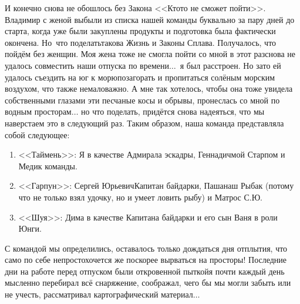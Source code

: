 И конечно снова не обошлось без Закона <<Кто\sdash то не сможет пойти>>. Владимир с женой выбыли из списка нашей команды буквально за пару дней до старта, когда уже были закуплены продукты и подготовка была фактически окончена. Но~что поделать\mdash такова Жизнь и Законы Сплава. Получалось, что пойдём без женщин. Моя жена тоже не смогла пойти со мной в этот раз\mdash снова не удалось совместить наши отпуска по времени$\ldots$~я был расстроен. Но зато ей удалось съездить на юг к морю\mdash позагорать и пропитаться солёным морским воздухом, что также немаловажно. А мне так хотелось, чтобы она тоже увидела собственными глазами эти песчаные косы и обрывы, пронеслась со мной по водным просторам$\ldots$ но что поделать, придётся снова надеяться, что мы наверстаем это в следующий раз. 
Таким образом, наша команда представляла собой следующее:
\begin{enumerate}
	\item <<Таймень>>: Я в качестве Адмирала эскадры, Геннадич\mdash мой Старпом и Медик команды.
	\item <<Гарпун>>: Сергей Юрьевич\mdash  Капитан байдарки, Паша\mdash наш Рыбак (потому что не только взял удочку, но и умеет ловить рыбу) и Матрос С.Ю.
	\item <<Шуя>>: Дима в качестве Капитана байдарки и его сын Ваня в роли Юнги.
\end{enumerate}

С командой мы определились, оставалось только дождаться дня отплытия, что само по себе непросто\mdash хочется же поскорее вырваться на просторы! Последние дни на работе перед отпуском были откровенной пыткой\mdash я почти каждый день мысленно перебирал всё снаряжение, соображал, чего бы мы могли забыть или не учесть, рассматривал картографический материал$\ldots$

\begin{center}
\end{center}
